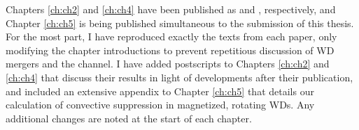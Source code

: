 Chapters \ref{ch:ch2} and \ref{ch:ch4} have been published as \cite{zhu+13} and \cite{zhu+15}, respectively, and Chapter \ref{ch:ch5} is being published simultaneous to the submission of this thesis.  For the most part, I have reproduced exactly the texts from each paper, only modifying the chapter introductions to prevent repetitious discussion of WD mergers and the \citeal{vkercj10} channel.  I have added postscripts to Chapters \ref{ch:ch2} and \ref{ch:ch4} that discuss their results in light of developments after their publication, and included an extensive appendix to Chapter \ref{ch:ch5} that details our calculation of convective suppression in magnetized, rotating WDs.  Any additional changes are noted at the start of each chapter.

